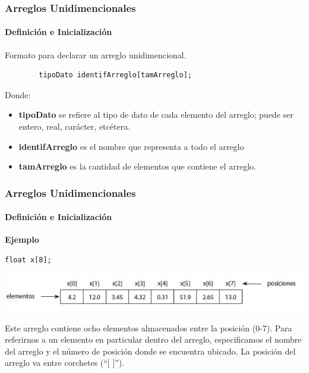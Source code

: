 \begin{frame}[fragile]
    \frametitle{Arreglos Unidimencionales}
    \framesubtitle{Definición e Inicialización}
    Formato para declarar un arreglo unidimencional.
    \vspace{2mm}
    \begin{lstlisting}
        tipoDato identifArreglo[tamArreglo];
\end{lstlisting}
Donde:
\begin{itemize}
    \item \textbf{tipoDato} se refiere al tipo de dato de cada elemento del arreglo; puede ser entero, real, carácter, etcétera.
    \item \textbf{identifArreglo} es el nombre que representa a todo el arreglo
    \item \textbf{tamArreglo} es la cantidad de elementos que contiene el arreglo.
\end{itemize}
\end{frame}


\begin{frame}[fragile, t]
    \frametitle{Arreglos Unidimencionales}
    \framesubtitle{Definición e Inicialización}
    \begin{center}\textbf{Ejemplo}\end{center}
        \vspace{-4mm}
    \begin{lstlisting}
float x[8];
    \end{lstlisting}
    \vspace{-5mm}
\begin{center}
        \includegraphics[scale=0.55]{figs/ejemploArregloUnidimencional}
\end{center}
\vspace{-6mm}
\justify
\hspace{5mm}Este arreglo contiene ocho elementos almacenados entre la posición (0-7). Para referirnos a un elemento en particular dentro del arreglo, especificamos el nombre del arreglo y el número de posición donde se encuentra ubicado. La posición del arreglo va entre corchetes (“[ ]”).
\end{frame}


